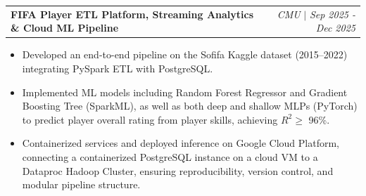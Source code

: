 \documentclass[letterpaper,11pt]{article}
\makeatletter
\newcommand{\resumeItem}[1]{
  \item\small{
    {#1 \vspace{-2pt}}
  }
}
\newcommand{\resumeProjectHeading}[2]{
    \item\small
    \begin{tabular*}{0.97\textwidth}{l@{\extracolsep{\fill}}r}
      \small#1 & #2 \\
    \end{tabular*}\vspace{-7pt}
}
\newcommand{\resumeItemListStart}{\begin{itemize}}
\newcommand{\resumeItemListEnd}{\end{itemize}\vspace{-5pt}}
\makeatother
\begin{document}


\resumeProjectHeading {\textbf{FIFA Player ETL Platform, Streaming Analytics \& Cloud ML Pipeline \faGithub}}{\emph{CMU} $|$ \textit{Sep 2025 - Dec 2025}}
  \resumeItemListStart
    \resumeItem{Developed an end-to-end pipeline on the Sofifa Kaggle dataset (2015–2022) integrating PySpark ETL with PostgreSQL.}
    \resumeItem{Implemented ML models including Random Forest Regressor and Gradient Boosting Tree (SparkML), as well as both deep and shallow MLPs (PyTorch) to predict player overall rating from player skills, achieving $R^2\ge$ 96\%.}
    \resumeItem{Containerized services and deployed inference on Google Cloud Platform, connecting a containerized PostgreSQL instance on a cloud VM to a Dataproc Hadoop Cluster, ensuring reproducibility, version control, and modular pipeline structure.}
  \resumeItemListEnd
\end{document}
